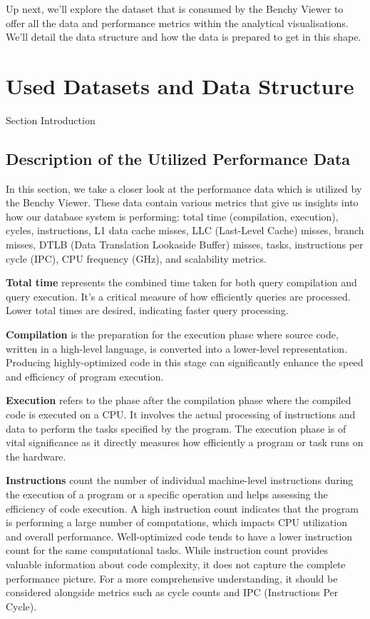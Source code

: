 Up next, we'll explore the dataset that is consumed by the Benchy Viewer to offer all the data and performance metrics within the analytical visualisations. We'll detail the data structure and how the data is prepared to get in this shape.

\section{Used Datasets and Data Structure}
Section Introduction
\subsection{Description of the Utilized Performance Data}
In this section, we take a closer look at the performance data which is utilized by the Benchy Viewer. These data contain various metrics that give us insights into how our database system is performing: total time (compilation, execution), cycles, instructions, L1 data cache misses, LLC (Last-Level Cache) misses, branch misses, DTLB (Data Translation Lookaside Buffer) misses, tasks, instructions per cycle (IPC), CPU frequency (GHz), and scalability metrics. 

\textbf{Total time} represents the combined time taken for both query compilation and query execution. It's a critical measure of how efficiently queries are processed. Lower total times are desired, indicating faster query processing.

\textbf{Compilation} is the preparation for the execution phase where source code, written in a high-level language, is converted into a lower-level representation. Producing highly-optimized code in this stage can significantly enhance the speed and efficiency of program execution.

\textbf{Execution} refers to the phase after the compilation phase where the compiled code is executed on a CPU. It involves the actual processing of instructions and data to perform the tasks specified by the program. The execution phase is of vital significance as it directly measures how efficiently a program or task runs on the hardware.

\textbf{Instructions} count the number of individual machine-level instructions during the execution of a program or a specific operation and helps assessing the efficiency of code execution. A high instruction count indicates that the program is performing a large number of computations, which impacts CPU utilization and overall performance. Well-optimized code tends to have a lower instruction count for the same computational tasks. While instruction count provides valuable information about code complexity, it does not capture the complete performance picture. For a more comprehensive understanding, it should be considered alongside metrics such as cycle counts and IPC (Instructions Per Cycle).

